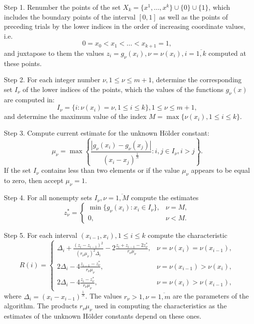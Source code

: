 \documentclass[runningheads]{llncs}
\begin{document}
Step 1. Renumber the points of the set \(X_k=\{x^1,\dotsc,x^k\}\cup\{0\}\cup\{1\}\), which
includes the boundary points of the interval \([0,1]\) as well as the points of preceding trials by
the lower indices in the order of increasing coordinate values, i.e.
\begin{equation}
  \label{eq:points}
  0=x_0<x_1<\dotsc<x_{k+1}=1,
\end{equation}
and juxtapose to them the values \(z_{i}=g_{\nu }(x_{i}),\nu =\nu (x_{i}),i={\overline {1,k}}\) computed at these points.

Step 2. For each integer number \(\nu ,1\leqslant \nu \leqslant m+1\), determine the corresponding
set \(I_{\nu }\) of the lower indices of the points, which the values of the functions \(g_{\nu
}(x)\) are computed in:
\begin{displaymath}
  I_{\nu }=\{i:\nu (x_{i})=\nu ,1\leqslant i\leqslant k\},1\leq \nu \leqslant m+1,
\end{displaymath}
and determine the maximum value of the index \(M=\max\{\nu (x_{i}),1\leq i\leq k\}\).

Step 3. Compute current estimate for the unknown H\"{o}lder constant:
\begin{equation}
  \label{step2}
  \mu _{\nu }=\max \left\{ \frac{|g_{\nu }(x_{i})-g_{\nu }(x_{j})|}{(x_{i}-
x_{j})^{\frac{1}{N}}}:i,j\in I_{\nu },i>j \right\}.
\end{equation}
If the set \(I_{\nu }\) contains less than two elements or if the value \(\mu _{\nu }\) appears to
be equal to zero, then accept \(\mu _{\nu }=1\).

Step 4. For all nonempty sets \(I_{\nu },\nu ={\overline {1,M}}\) compute the estimates
\begin{equation}
  \label{eq:step_4}
  z_{\nu }^{*}={\begin{cases}\min\{g_{\nu }(x_{i}):x_{i}\in I_{\nu }\},&\nu =M,\\
  0,&\nu <M.\end{cases}}
\end{equation}

Step 5. For each interval \((x_{i-1},x_{i}),1\leqslant i\leqslant k\) compute the characteristic
\begin{equation}
  \label{step3_1}
  R(i)={\begin{cases}\Delta _{i}+{\frac {(z_{i}-z_{i-1})^{2}}{(r_{\nu }\mu _{\nu
})^{2}\Delta _{i}}}-2{\frac {z_{i}+z_{i-1}-2z_{\nu }^{*}}{r_{\nu }\mu _{\nu }}},&\nu =\nu
(x_{i})=\nu (x_{i-1}),\\2\Delta _{i}-4{\frac {z_{i-1}-z_{\nu }^{*}}{r_{\nu }\mu _{\nu
}}},&\nu =\nu (x_{i-1})>\nu (x_{i}),\\2\Delta _{i}-4{\frac {z_{i}-z_{\nu }^{*}}{r_{\nu }\mu
_{\nu }}},&\nu =\nu (x_{i})>\nu (x_{i-1}),\end{cases}}
\end{equation}
where \(\Delta_{i}=(x_{i}-x_{i-1})^{\frac{1}{N}}\).
The values \(r_{\nu }>1,\nu ={\overline {1,m}}\) are the parameters of the algorithm.
The products \(r_{\nu}\mu_{\nu}\) used in computing the characteristics as the estimates of the
unknown H\"{o}lder constants depend on these ones.
\end{document}
